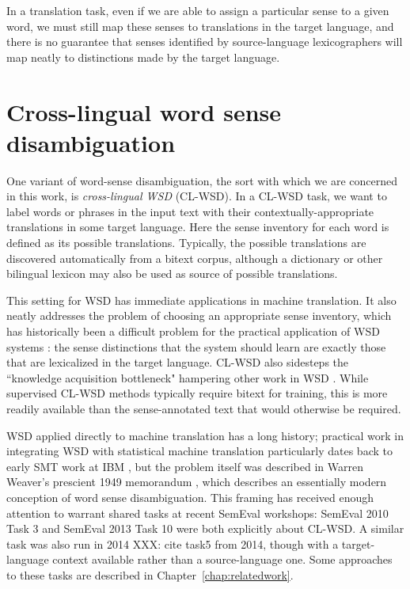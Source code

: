 In a translation task, even if we are able to assign a particular sense to a
given word, we must still map these senses to translations in the target
language, and there is no guarantee that senses identified by source-language
lexicographers will map neatly to distinctions made by the target language.




\section{Cross-lingual word sense disambiguation}
\label{sec:clwsd}

One variant of word-sense disambiguation, the sort with which we are concerned
in this work, is \emph{cross-lingual WSD} (CL-WSD).  In a CL-WSD task, we  want
to label words or phrases in the input text with their contextually-appropriate
translations in some target language.
Here the sense inventory for each word is defined as its possible
translations. Typically, the possible translations are discovered automatically
from a bitext corpus, although a dictionary or other bilingual lexicon may also
be used as source of possible translations.

This setting for WSD has immediate applications in machine translation. It
also neatly addresses the problem of choosing an appropriate sense inventory,
which has historically been a difficult problem for the practical application
of WSD systems \cite{agirre2006word}: the sense distinctions that the system
should learn are exactly those that are lexicalized in the target language.
CL-WSD also sidesteps the ``knowledge acquisition bottleneck" hampering other
work in WSD \cite{lefever-hoste-decock:2011:ACL-HLT2011}.
While supervised CL-WSD methods typically require bitext for training, this is
more readily available than the sense-annotated text that would otherwise be
required.

WSD applied directly to machine translation has a long history; practical work
in integrating WSD with statistical machine translation particularly dates back
to early SMT work at IBM \cite{Brown91word-sensedisambiguation}, but the
problem itself was described in Warren Weaver's prescient 1949 memorandum
\cite{weavermemo}, which describes an essentially modern conception of word
sense disambiguation.
This framing has received enough attention to warrant shared tasks at recent
SemEval workshops: SemEval 2010 Task 3 \cite{lefever-hoste:2009:SEW}
and SemEval 2013 Task 10 \cite{task10} were both explicitly about CL-WSD.
A similar task was also run in 2014 XXX: cite task5 from 2014, though with a
target-language context available rather than a  source-language one.
Some approaches to these tasks are described in Chapter~\ref{chap:relatedwork}.


